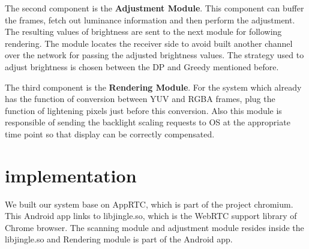 The second component is the {\bf Adjustment Module}. This component
can buffer the frames, fetch out luminance information and then
perform the adjustment. The resulting values of brightness are sent to
the next module for following rendering. The module locates the
receiver side to avoid built another channel over the network for
passing the adjusted brightness values. The strategy used to adjust
brightness is chosen between the DP and Greedy mentioned before.


The third component is the {\bf Rendering Module}. For the system which
already has the function of conversion between YUV and RGBA frames,
plug the function of lightening pixels just before this
conversion. Also this module is responsible of sending the backlight
scaling requests to OS at the appropriate time point so that display
can be correctly compensated. 


\section{implementation}

We built our system base on AppRTC, which is part of the project
chromium. This Android app links to libjingle.so, which is the WebRTC
support library of Chrome browser. The scanning module and adjustment
module resides inside the libjingle.so and Rendering module is part of
the Android app.



